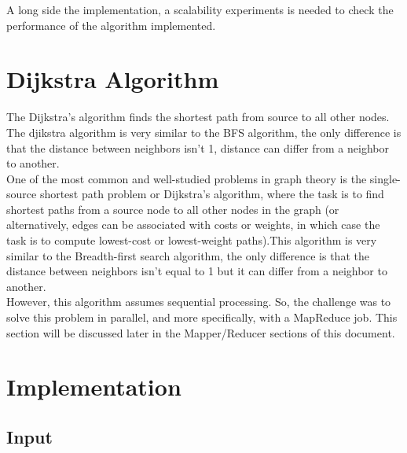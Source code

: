 \documentclass[english]{article}
\begin{document}
A long side the implementation, a scalability experiments is needed to check the performance of the algorithm implemented.

\section{Dijkstra Algorithm}
The Dijkstra’s algorithm finds the shortest path from source to all other nodes. The djikstra algorithm is very similar to the BFS algorithm, the only difference is that the distance between neighbors isn't 1, distance can differ from a neighbor to another.\\

One of the most common and well-studied problems in graph theory is the single-source shortest path problem or Dijkstra’s algorithm, where the task is to find shortest paths from a source node to all other nodes in the graph (or alternatively, edges can be associated with costs or weights, in which case the task is to compute lowest-cost or lowest-weight paths).This algorithm is very similar to the Breadth-first search algorithm, the only difference is that the distance between neighbors isn't equal to 1 but it can differ from a neighbor to another.\\

However, this algorithm assumes sequential processing. So, the challenge was to solve this problem in parallel, and more specifically, with a MapReduce job. This section will be discussed later in the Mapper/Reducer sections of this document.

\newpage
\section{Implementation}
\subsection{Input}
\end{document}
